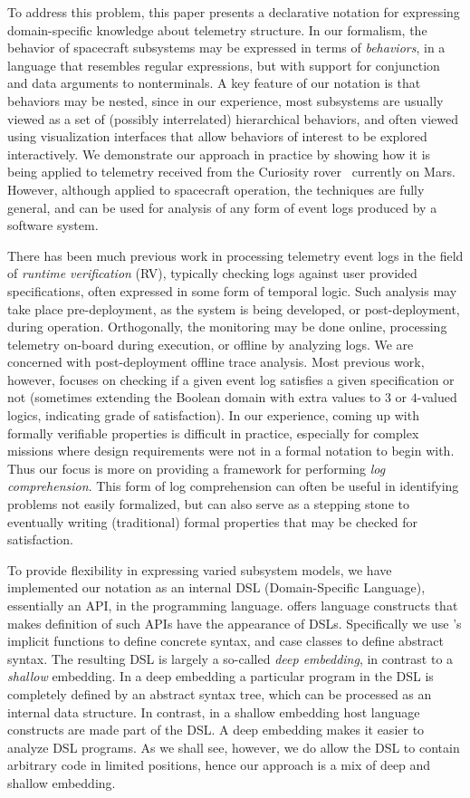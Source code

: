 To address this problem, this paper presents a declarative notation
for expressing domain-specific knowledge about telemetry structure.
In our formalism, the behavior of spacecraft subsystems may be
expressed in terms of {\em behaviors}, in a language that resembles
regular expressions, but with support for conjunction and data
arguments to nonterminals.  A key feature of our notation is that
behaviors may be nested, since in our experience, most subsystems are
usually viewed as a set of (possibly interrelated) hierarchical
behaviors, and often viewed using visualization interfaces that allow
behaviors of interest to be explored interactively.  We demonstrate
our approach in practice by showing how it is being applied to
telemetry received from the Curiosity rover~\cite{msl} currently on
Mars.  However, although applied to spacecraft operation, the
techniques are fully general, and can be used for analysis of any form
of event logs produced by a software system.

There has been much previous work in processing telemetry event logs
in the field of {\em runtime verification} (RV), typically checking logs
against user provided specifications, often expressed in some form of
temporal logic.  Such analysis may take place pre-deployment, as the
system is being developed, or post-deployment, during operation.
Orthogonally, the monitoring may be done online, processing telemetry
on-board during execution, or offline by analyzing logs.  We
are concerned with post-deployment offline trace analysis.  Most
previous work, however, focuses on checking if a given event log
satisfies a given specification or not (sometimes extending the
Boolean domain with extra values to $3$ or $4$-valued logics,
indicating grade of satisfaction).  In our experience, coming up with
formally verifiable properties is difficult in practice, especially
for complex missions where design requirements were not in a formal
notation to begin with.  Thus our focus is more on providing a
framework for performing {\em log comprehension}.  This form of log
comprehension can often be useful in identifying problems not easily
formalized, but can also serve as a stepping stone to eventually
writing (traditional) formal properties that may be checked for
satisfaction.

To provide flexibility in expressing varied subsystem models, we have
implemented our notation as an internal DSL (Domain-Specific
Language), essentially an API, in the \scala{}
programming language. \scala{} offers language constructs that makes
definition of such APIs have the appearance of DSLs.  Specifically we
use \scala's implicit functions to define concrete syntax, and case
classes to define abstract syntax. The resulting DSL is largely a
so-called {\em deep embedding}, in contrast to a {\em shallow}
embedding. In a deep embedding a particular program in the DSL is
completely defined by an abstract syntax tree, which can be processed
as an internal data structure. In contrast, in a shallow embedding
host language constructs are made part of the DSL.  
A deep embedding makes it easier to analyze DSL programs.
As we shall see,
however, we do allow the DSL to contain arbitrary \scala{} code in
limited positions, hence our approach is a mix of deep and shallow
embedding.


